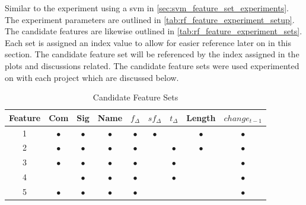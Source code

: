 

Similar to the experiment using a \gls{svm} in \autoref{sec:svm_feature_set_experiments}. The experiment parameters are outlined in \autoref{tab:rf_feature_experiment_setup}. The candidate features are likewise outlined in \autoref{tab:rf_feature_experiment_sets}. Each set is assigned an index value to allow for easier reference later on in this section. The candidate feature set will be referenced by the index assigned in the plots and discussions related. The candidate feature sets were used experimented on with each project which are discussed below.

\begin{table}[h]
\begin{center}

    \begin{tabular}{|c|c|c|c|c|c|c|c|c|}
        \hline
        Feature & Com & Sig & Name & $f_{\Delta}$ & $sf_{\Delta}$ & $t_\Delta$ & Length & $change_{t-1}$ \\
         \hline
        1 & $\bullet$ & $\bullet$ & $\bullet$ & $\bullet$ & $\bullet$ & & $\bullet$ & $\bullet$ \\
        2 & $\bullet$ & $\bullet$ & $\bullet$ & $\bullet$ & & $\bullet$ & $\bullet$ & $\bullet$ \\
        3 & $\bullet$ & $\bullet$ & $\bullet$ & $\bullet$ & & $\bullet$ & & $\bullet$ \\
        4 & & $\bullet$ & $\bullet$ & $\bullet$ & & $\bullet$ & & $\bullet$ \\
        5 & $\bullet$ & $\bullet$ & $\bullet$ & $\bullet$ & & & & $\bullet$ \\ \hline
    \end{tabular}
    \caption{Candidate Feature Sets}
    \label{tab:rf_feature_experiment_sets}
\end{center}

\end{table}

